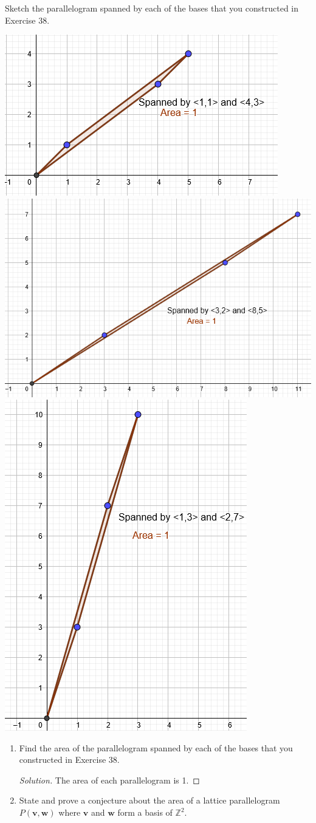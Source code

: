 \documentclass[12pt]{article}
\newcommand{\Z}{\mathbb{Z}}
\newenvironment{exercise}[2][Exercise]{\begin{trivlist}
        \item[\hskip \labelsep {\bfseries #1}\hskip \labelsep {\bfseries #2.}]}{\end{trivlist}}
\newenvironment{solution}
        {\begin{proof}[Solution]}
                    {\end{proof}}
\begin{document}
\begin{exercise}{39}
    Sketch the parallelogram spanned by each of the bases that you constructed in Exercise 38.
    \begin{center}
        \includegraphics[width=.5\linewidth]{39-2}
        \includegraphics[width=.5 \linewidth]{39-1}
        \includegraphics[width=.4\linewidth]{39-3}
    \end{center}
    \begin{enumerate}[label=(\alph*)]
        \item Find the area of the parallelogram spanned by each of the bases that you constructed in Exercise 38.
            \begin{solution}
                The area of each parallelogram is 1.
            \end{solution}
        \item State and prove a conjecture about the area of a lattice parallelogram \( P(\mathbf{v,w}) \) where \( \mathbf{v} \) and \( \mathbf{w} \) form a basis of \( \Z^{2}. \)

\end{enumerate}
\end{exercise}
\end{document}
